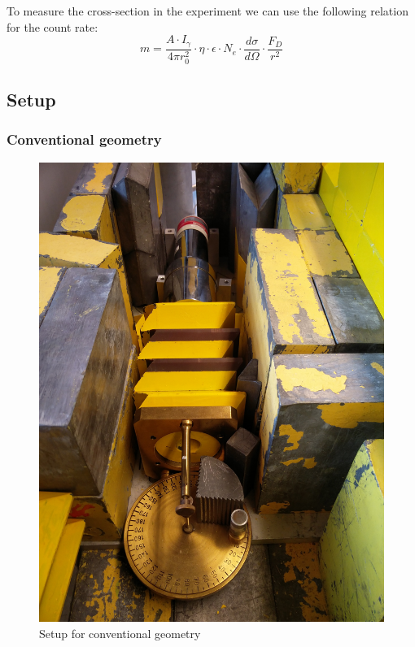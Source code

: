 \documentclass[a4paper,12pt]{article}
\begin{document}
To measure the cross-section in the experiment we can use the following relation for the count rate:
\begin{equation}
	m = \frac{A \cdot I_\gamma}{4 \pi r_0^2} \cdot \eta \cdot \epsilon \cdot N_e \cdot \frac{d\sigma}{d\Omega} \cdot \frac{F_D}{r^2}
\end{equation}



\subsection{Setup}

\subsubsection{Conventional geometry}

\begin{figure}[H]
	\centering
	\includegraphics[scale=0.1]{../Figures/conv.jpg}
	\caption{Setup for conventional geometry}
	\label{setCalib}
\end{figure}
\end{document}
